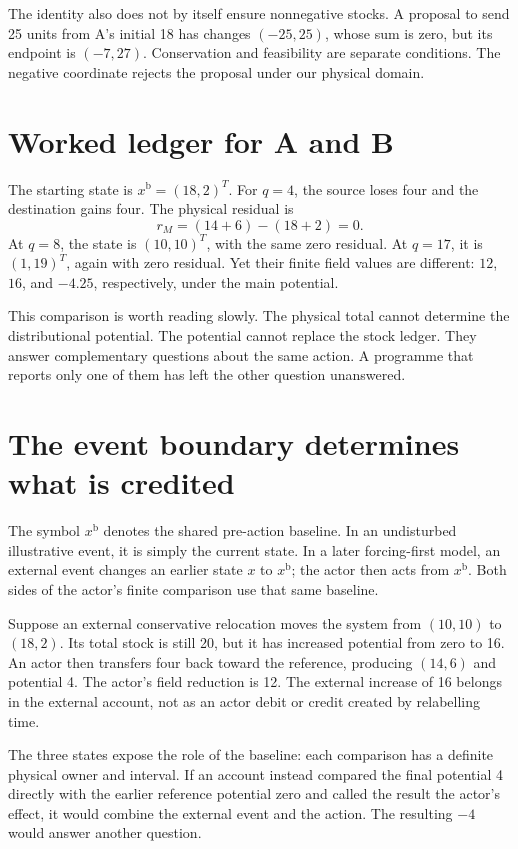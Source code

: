 The identity also does not by itself ensure nonnegative stocks. A proposal to send 25 units from A's initial 18 has changes \((-25,25)\), whose sum is zero, but its endpoint is \((-7,27)\). Conservation and feasibility are separate conditions. The negative coordinate rejects the proposal under our physical domain.

\section{Worked ledger for A and B}
The starting state is \(x^{\mathrm{b}}=(18,2)^T\). For \(q=4\), the source loses four and the destination gains four. The physical residual is
\begin{equation}
 r_M=(14+6)-(18+2)=0.
\end{equation}
At \(q=8\), the state is \((10,10)^T\), with the same zero residual. At \(q=17\), it is \((1,19)^T\), again with zero residual. Yet their finite field values are different: \(12\), \(16\), and \(-4.25\), respectively, under the main potential.

This comparison is worth reading slowly. The physical total cannot determine the distributional potential. The potential cannot replace the stock ledger. They answer complementary questions about the same action. A programme that reports only one of them has left the other question unanswered.

\section{The event boundary determines what is credited}
The symbol \(x^{\mathrm{b}}\) denotes the shared pre-action baseline. In an undisturbed illustrative event, it is simply the current state. In a later forcing-first model, an external event changes an earlier state \(x\) to \(x^{\mathrm{b}}\); the actor then acts from \(x^{\mathrm{b}}\). Both sides of the actor's finite comparison use that same baseline.

Suppose an external conservative relocation moves the system from \((10,10)\) to \((18,2)\). Its total stock is still 20, but it has increased potential from zero to 16. An actor then transfers four back toward the reference, producing \((14,6)\) and potential 4. The actor's field reduction is 12. The external increase of 16 belongs in the external account, not as an actor debit or credit created by relabelling time.

The three states expose the role of the baseline: each comparison has a definite physical owner and interval. If an account instead compared the final potential 4 directly with the earlier reference potential zero and called the result the actor's effect, it would combine the external event and the action. The resulting \(-4\) would answer another question.

